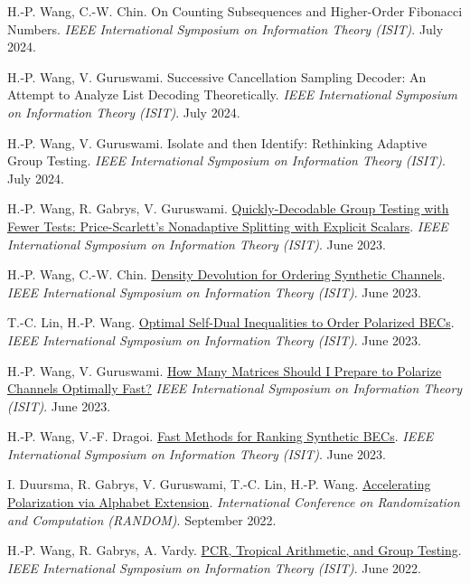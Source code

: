 \documentclass{article}
\def\sec#1{\vskip1em\textbf{\fs1#1}}
\def\fs#1{%
        \pgfmathsetmacro\a{#1}%
        \pgfmathsetmacro\A{\parskip*(4/3)^\a}%
        \pgfmathsetmacro\B{\A*(4/3)}%
        \fontsize{\A pt}{\B pt}\selectfont%
    }
\begin{document}
\bgroup
\def\section#1#2{\sec{Peer-Reviewed Conference Publications \mdseries (new to old)}}
\begin{thebibliography}{C99}
     H.-P. Wang, C.-W. Chin.
    {On Counting Subsequences and Higher-Order Fibonacci Numbers}.
    \emph{IEEE International Symposium on Information Theory (ISIT)}.
    July 2024.
 
     H.-P. Wang, V. Guruswami.
    {Successive Cancellation Sampling Decoder:
        An Attempt to Analyze List Decoding Theoretically}.
    \emph{IEEE International Symposium on Information Theory (ISIT)}.
    July 2024.
 
     H.-P. Wang, V. Guruswami.
    {Isolate and then Identify: Rethinking Adaptive Group Testing}.
    \emph{IEEE International Symposium on Information Theory (ISIT)}.
    July 2024.

    H.-P. Wang, R. Gabrys, V. Guruswami.
    \href{https://doi.org/10.1109/ISIT54713.2023.10206843}
    {Quickly-Decodable Group Testing with Fewer Tests:
        Price-Scarlett's Nonadaptive Splitting with Explicit Scalars}.
    \emph{IEEE International Symposium on Information Theory (ISIT)}.
    June 2023.

    H.-P. Wang, C.-W. Chin.
    \href{https://doi.org/10.1109/ISIT54713.2023.10206540}
    {Density Devolution for Ordering Synthetic Channels}.
    \emph{IEEE International Symposium on Information Theory (ISIT)}.
    June 2023.

    T.-C. Lin, H.-P. Wang.
    \href{https://doi.org/10.1109/ISIT54713.2023.10206451}
    {Optimal Self-Dual Inequalities to Order Polarized BECs}.
    \emph{IEEE International Symposium on Information Theory (ISIT)}.
    June 2023.

    H.-P. Wang, V. Guruswami.
    \href{https://doi.org/10.1109/ISIT54713.2023.10206989}
    {How Many Matrices Should I Prepare to Polarize Channels Optimally Fast?}
    \emph{IEEE International Symposium on Information Theory (ISIT)}.
    June 2023.

    H.-P. Wang, V.-F. Dragoi.
    \href{https://doi.org/10.1109/ISIT54713.2023.10206704}
    {Fast Methods for Ranking Synthetic BECs}.
    \emph{IEEE International Symposium on Information Theory (ISIT)}.
    June 2023.

    I. Duursma, R. Gabrys, V. Guruswami, T.-C. Lin, H.-P. Wang.
    \href{https://doi.org/10.4230/LIPIcs.APPROX/RANDOM.2022.17}
    {Accelerating Polarization via Alphabet Extension}.
    \emph{International Conference on Randomization and Computation (RANDOM)}.
    September 2022.

    H.-P. Wang, R. Gabrys, A. Vardy.
    \href{https://doi.org/10.1109/ISIT50566.2022.9834718}
    {PCR, Tropical Arithmetic, and Group Testing}.
    \emph{IEEE International Symposium on Information Theory (ISIT)}.
    June 2022.
\end{thebibliography}
\egroup
\end{document}
